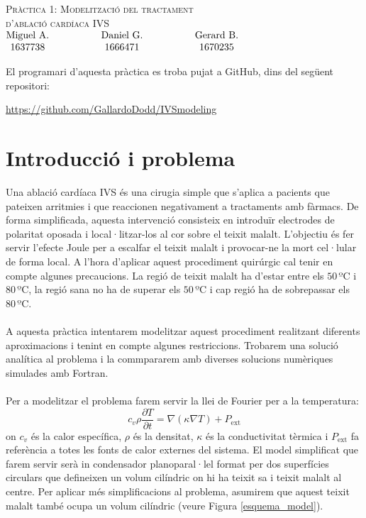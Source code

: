 \documentclass{article}
\begin{document}
\thispagestyle{empty}
\begin{center}
    {\LARGE \textsc{Pràctica 1: Modelització del tractament}}\\ 
    \vspace{0.2cm}
    {\LARGE \textsc{d'ablació cardíaca IVS}}\\ 
    \vspace{0.2cm}
    $\begin{matrix} 
    \text{Miguel A.} \hspace{1.5cm} & \text{Daniel G.} & \hspace{1.5cm} \text{Gerard B.}\\1637738 \hspace{1.5cm} & 1666471 & \hspace{1.5cm} 1670235
    \end{matrix}$

    
\end{center}
El programari d'aquesta pràctica es troba pujat a GitHub, dins del següent repositori:
\begin{center}
    \url{https://github.com/GallardoDodd/IVSmodeling}
\end{center}
\section{Introducció i problema}
Una ablació cardíaca IVS és una cirugia simple que s'aplica a pacients que pateixen arritmies i que reaccionen negativament a tractaments amb fàrmacs. De forma simplificada, aquesta intervenció consisteix en introduïr electrodes de polaritat oposada i local·litzar-los al cor sobre el teixit malalt. L'objectiu és fer servir l'efecte Joule per a escalfar el teixit malalt i provocar-ne la mort cel·lular de forma local. A l'hora d'aplicar aquest procediment quirúrgic cal tenir en compte algunes precaucions. La regió de teixit malalt ha d'estar entre els \(50\,\text{ºC}\) i \(80\,\text{ºC}\), la regió sana no ha de superar els \(50\,\text{ºC}\) i cap regió ha de sobrepassar els \(80\,\text{ºC}\).\\\\
A aquesta pràctica intentarem modelitzar aquest procediment realitzant diferents aproximacions i tenint en compte algunes restriccions. Trobarem una solució analítica al problema i la commpararem amb diverses solucions numèriques simulades amb Fortran.\\\\
Per a modelitzar el problema farem servir la llei de Fourier per a la temperatura:
\begin{equation*}
    c_{v}\rho \frac{\partial T}{\partial t} = \nabla (\kappa \nabla T) + P_{\text{ext}}
\end{equation*}
on $c_{v}$ és la calor específica, $\rho$ és la densitat, $\kappa$ és la conductivitat tèrmica i $P_{\text{ext}}$ fa referència a totes les fonts de calor externes del sistema. El model simplificat que farem servir serà in condensador planoparal·lel format per dos superfícies circulars que defineixen un volum cilíndric on hi ha teixit sa i teixit malalt al centre. Per aplicar més simplificacions al problema, asumirem que aquest teixit malalt també ocupa un volum cilíndric (veure Figura \ref{esquema_model}). 
\end{document}
